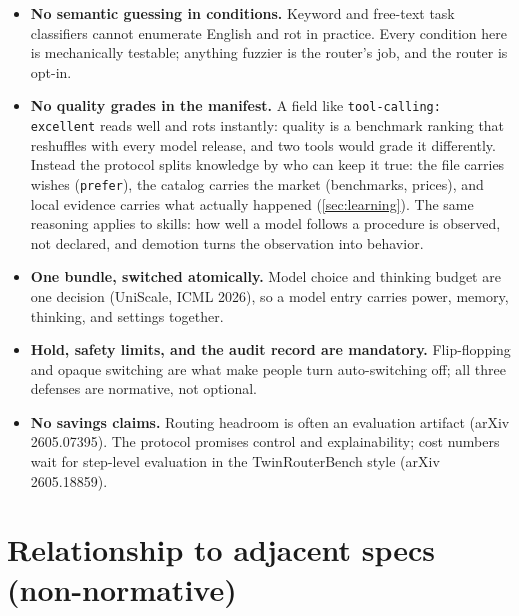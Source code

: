 \documentclass[11pt]{article}
\newcommand{\key}[1]{\texttt{#1}}
\begin{document}
\begin{itemize}
        model assignments and argued the decision belongs client-side.
  \item \textbf{No semantic guessing in conditions.} Keyword and free-text
        task classifiers cannot enumerate English and rot in practice. Every
        condition here is mechanically testable; anything fuzzier is the
        router's job, and the router is opt-in.
  \item \textbf{No quality grades in the manifest.} A field like
        \key{tool-calling: excellent} reads well and rots instantly: quality
        is a benchmark ranking that reshuffles with every model release, and
        two tools would grade it differently. Instead the protocol splits
        knowledge by who can keep it true: the file carries wishes
        (\key{prefer}), the catalog carries the market (benchmarks, prices),
        and local evidence carries what actually happened
        (\ref{sec:learning}). The same reasoning applies to skills: how well
        a model follows a procedure is observed, not declared, and demotion
        turns the observation into behavior.
  \item \textbf{One bundle, switched atomically.} Model choice and thinking
        budget are one decision (UniScale, ICML 2026), so a model entry
        carries power, memory, thinking, and settings together.
  \item \textbf{Hold, safety limits, and the audit record are mandatory.}
        Flip-flopping and opaque switching are what make people turn
        auto-switching off; all three defenses are normative, not optional.
  \item \textbf{No savings claims.} Routing headroom is often an evaluation
        artifact (arXiv 2605.07395). The protocol promises control and
        explainability; cost numbers wait for step-level evaluation in the
        TwinRouterBench style (arXiv 2605.18859).
\end{itemize}

\section{Relationship to adjacent specs (non-normative)}
\end{document}
